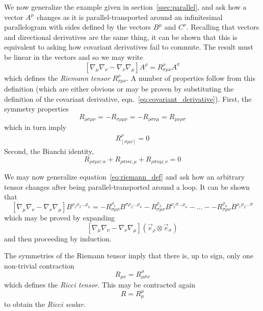 We now generalize the example given in section~\ref{ssec:parallel}, and
ask how a vector $A^\mu$ changes as it is parallel-transported around
an infinitesimal parallelogram with sides defined by the vectors
$B^\mu$ and $C^\nu$.  Recalling that vectors and directional
derivatives are the same thing, it can be shown that this is
equivalent to asking how covariant derivatives fail to commute.  The
result must be linear in the vectors and so we may write
%
\begin{equation}
\label{eq:riemann_def}
\left[\nabla_\mu \nabla_\nu - \nabla_\nu \nabla_\mu\right] A^\rho
= R^\rho_{\sigma\mu\nu} A^\sigma
\end{equation}
%
which defines the \emph{Riemann tensor} $R^\rho_{\sigma\mu\nu}$.  A
number of properties follow from this definition (which are either
obvious or may be proven by substituting the definition of the
covariant derivative, eqn.~\ref{eq:covariant_derivative}).  First,
the symmetry properties
%
\begin{equation}
\label{eq:symmetries}
R_{\rho\sigma\mu\nu}
= -R_{\sigma\rho\mu\nu}
= -R_{\rho\sigma\nu\mu}
= R_{\mu\nu\rho\sigma}
\end{equation}
%
which in turn imply
%
\begin{align}
R^\rho_{[\sigma\mu\nu]} = 0
\end{align}
%
Second, the Bianchi identity,
%
\begin{equation}
\label{eq:bianchi}
R_{\rho\sigma\mu\nu;\alpha}
+R_{\rho\sigma\nu\alpha;\mu}
+R_{\rho\sigma\alpha\mu;\nu} = 0
\end{equation}

We may now generalize equation~\ref{eq:riemann_def} and ask how an
arbitrary tensor changes after being parallel-transported 
around a loop.  It can be shown that
%
\begin{equation}
\label{eq:higher_order_riemann}
\left[\nabla_\mu \nabla_\nu - \nabla_\nu \nabla_\mu\right] 
B^{\rho_1 \rho_2 \ldots \rho_n}
= - R^{\rho_1}_{\sigma \mu\nu} B^{\sigma \rho_2 \ldots \rho_n}
- R^{\rho_2}_{\sigma \mu\nu} B^{\rho_1 \sigma \ldots \rho_n}
- \ldots -
- R^{\rho_n}_{\sigma \mu\nu} B^{\rho_1 \rho_2 \ldots \sigma }
\end{equation}
%
which may be proved by expanding
%
\begin{equation*}
\left[\nabla_\mu \nabla_\nu - \nabla_\nu \nabla_\mu\right] 
(\vec{e}_\rho \otimes \vec{e}_\sigma)
\end{equation*}
%
and then proceeding by induction.  

The symmetries of the Riemann tensor imply that there is, up to sign,
only one non-trivial contraction
%
\begin{equation}
R_{\mu\nu} = R^\sigma_{\mu\sigma\nu}
\end{equation}
%
which defines the \emph{Ricci tensor}.  This may be contracted again
%
\begin{equation}
R = R^\mu_\mu
\end{equation}
%
to obtain the \emph{Ricci scalar}.

